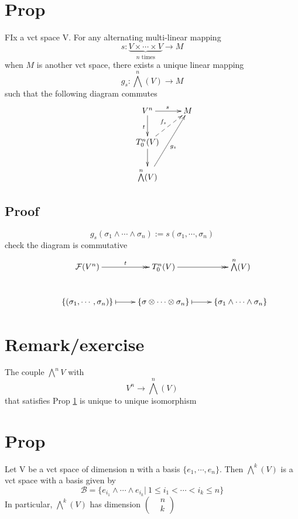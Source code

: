 \documentclass{book}
\begin{document}
\section{Prop}
\label{VIII-46.8}
FIx a vct space V. For any alternating multi-linear mapping
$$s:\underbrace{V\times\cdots\times V}\limits_{n\text{ times}}\rightarrow M$$
when $M$ is another vct space, there exists a unique linear mapping$$g_s:\bigwedge\limits^n(V)\rightarrow M$$
such that the following diagram commutes
$$\xymatrix{
    & V^n\ar[d]_t\ar[r]^s & M\\
    &T^n_0(V)\ar@{-->}[ur]^{f_s}\ar[d] &\\
    & \bigwedge\limits^n(V)\ar[uur]_{g_s}
}$$
\subsection*{Proof}
$$g_s(\sigma_1\wedge\cdots\wedge\sigma_n):=s(\sigma_1,\cdots,\sigma_n)$$
check the diagram is commutative
$$\xymatrix{
    &\mathcal{F}(V^n)\ar@{->>}[r]^t &T^n_0(V)\ar@{->>}[r]&\bigwedge\limits^n(V)\\
    &\{(\sigma_1,\cdots,\sigma_n)\}\ar@{|->}[r]&\{\sigma\otimes\cdots\otimes\sigma_n\}\ar@{|->}[r]&\{\sigma_1\wedge\cdots\wedge\sigma_n\}
}$$
\section{Remark/exercise}
The couple $\bigwedge\limits^nV$ with
$$V^n\rightarrow\bigwedge\limits^n(V)$$
that satisfies Prop \ref{VIII-46.8} is unique to unique isomorphism
\section{Prop}
Let V be a vct space of dimension n with a basis $\{e_1,\cdots,e_n\}$. Then $\bigwedge\limits^k(V)$ is a vct space with a basis given by $$\mathcal{B}=\{e_{i_1}\wedge\cdots\wedge e_{i_k}\big|\ 1\leq i_1<\cdots<i_k\leq n\}$$
In particular, $\bigwedge\limits^k(V)$ has dimension $\left(\begin{aligned}
    &n \\ &k
\end{aligned}
\right)$
\end{document}
